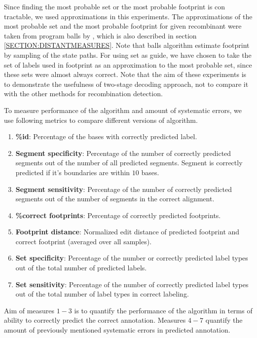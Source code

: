 Since finding the most probable set or the most probable footprint is con
tractable, we used approximations in this experiments. The approximations of the
most probable set and the most probable footprint for given recombinant were
taken from program balls by \cite{Brown2010}, which is also described in section
\ref{SECTION:DISTANTMEASURES}. Note that balls algorithm estimate footprint by
sampling of the state paths. For using set as guide, we have chosen to take the
set of labels used in footprint as an approximation to the most probable set,
since these sets were almost always correct. Note that the aim of these
experiments is to demonstrate the usefulness of two-stage decoding approach, not
to compare it with the other methods for recombination detection.

To measure performance of the algorithm and amount of systematic errors, we use
following metrics to compare different versions of algorithm.
\begin{enumerate}[itemsep=-1mm]
\item {\bf \%id}: Percentage of the bases with correctly predicted label.

\item {\bf Segment specificity}: Percentage of the number of correctly predicted
segments out of the number of all predicted segments. Segment is correctly
predicted if it's boundaries are within $10$ bases.

\item {\bf Segment sensitivity}: Percentage of the number of correctly predicted
segments out of the number of segments in the correct alignment.

\item {\bf \%correct footprints}: Percentage of correctly predicted footprints.

\item {\bf Footprint distance}: Normalized edit distance of predicted footprint
and correct footprint (averaged over all samples).

\item {\bf Set specificity}: Percentage of the number or correctly predicted label
types out of the total number of predicted labels.

\item {\bf Set sensitivity}: Percentage of the number of correctly predicted label
types out of the total number of label types in correct labeling.

\end{enumerate} 
Aim of measures $1-3$ is to quantify the performance of the algorithm in terms
of ability to correctly predict the correct annotation. Measures $4-7$ quantify
the amount of previously mentioned systematic errors in predicted annotation.


